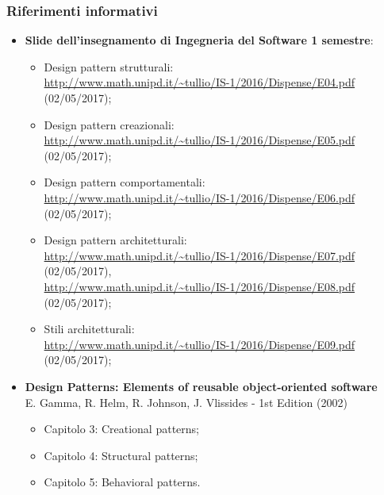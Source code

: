 \documentclass[../PianoDiQualifica.tex]{subfiles}
\begin{document}
			\subsubsection{Riferimenti informativi}	
				\begin{itemize}
					\item \textbf{Slide dell'insegnamento di Ingegneria del Software
					1 semestre}:
					\begin{itemize}
						\item Design pattern strutturali:\\
						\url{http://www.math.unipd.it/~tullio/IS-1/2016/Dispense/E04.pdf} (02/05/2017);
						\item Design pattern creazionali:\\
						\url{http://www.math.unipd.it/~tullio/IS-1/2016/Dispense/E05.pdf} (02/05/2017);
						\item Design pattern comportamentali:\\
						\url{http://www.math.unipd.it/~tullio/IS-1/2016/Dispense/E06.pdf} (02/05/2017);
						\item Design pattern architetturali:\\
						\url{http://www.math.unipd.it/~tullio/IS-1/2016/Dispense/E07.pdf} (02/05/2017),\\
						\url{http://www.math.unipd.it/~tullio/IS-1/2016/Dispense/E08.pdf} (02/05/2017);
						\item Stili architetturali:\\
						\url{http://www.math.unipd.it/~tullio/IS-1/2016/Dispense/E09.pdf} (02/05/2017);
					\end{itemize}
					\item \textbf{Design Patterns: Elements of reusable object-oriented software}\\
					E. Gamma, R. Helm, R. Johnson, J. Vlissides - 1st Edition (2002)
					\begin{itemize}
						\item Capitolo 3: Creational patterns;
						\item Capitolo 4: Structural patterns;
						\item Capitolo 5: Behavioral patterns.
					\end{itemize}
				\end{itemize}
\end{document}
